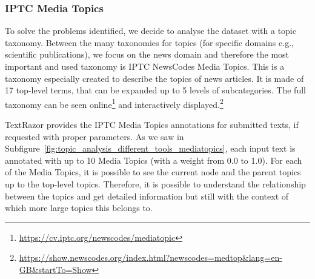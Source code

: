 



\subsubsection{\statusgreen IPTC Media Topics}

To solve the problems identified, %
we decide to analyse the dataset with a topic taxonomy.
Between the many taxonomies for topics (for specific domains e.g., scientific publications\cite{vayansky2020review,churchill2022evolution}), we focus on the news domain and therefore the most important and used taxonomy is IPTC NewsCodes Media Topics.
This is a taxonomy especially created to describe the topics of news articles. It is made of 17 top-level terms, that can be expanded up to 5 levels of subcategories.
The full taxonomy can be seen online\footnote{\url{https://cv.iptc.org/newscodes/mediatopic}} and interactively displayed.\footnote{\url{https://show.newscodes.org/index.html?newscodes=medtop&lang=en-GB&startTo=Show}}




TextRazor provides the IPTC Media Topics annotations for submitted texts, if requested with proper parameters.
As we saw in Subfigure~\ref{fig:topic_analysis_different_tools_mediatopics}, each input text is annotated with up to 10 Media Topics (with a weight from 0.0 to 1.0). For each of the Media Topics, it is possible to see the current node and the parent topics up to the top-level topics.
Therefore, it is possible to understand the relationship between the topics and get detailed information but still with the context of which more large topics this belongs to.


